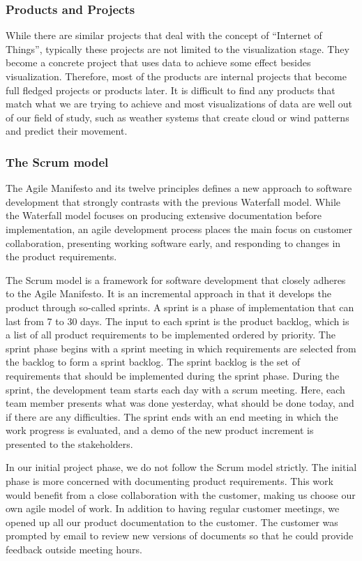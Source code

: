 \documentclass[../document]{subfiles}
\begin{document}
\subsubsection{Products and Projects}
While there are similar projects that deal with the concept of “Internet of Things”, typically these projects are not limited to the visualization stage. They become a concrete project that uses data to achieve some effect besides visualization. Therefore, most of the products are internal projects that become full fledged projects or products later. It is difficult to find any products that match what we are trying to achieve and most visualizations of data are well out of our field of study, such as weather systems that create cloud or wind patterns and predict their movement.

\subsubsection{The Scrum model}
The Agile Manifesto and its twelve principles defines a new approach to software development that strongly contrasts with the previous Waterfall model. While the Waterfall model focuses on producing extensive documentation before implementation, an agile development process places the main focus on customer collaboration, presenting working software early, and responding to changes in the product requirements. 

The Scrum model is a framework for software development that closely adheres to the Agile Manifesto. It is an incremental approach in that it develops the product through so-called sprints. A sprint is a phase of implementation that can last from 7 to 30 days. The input to each sprint is the product backlog, which is a list of all product requirements to be implemented ordered by priority. The sprint phase begins with a sprint meeting in which requirements are selected from the backlog to form a sprint backlog. The sprint backlog is the set of requirements that should be implemented during the sprint phase. During the sprint, the development team starts each day with a scrum meeting. Here, each team member presents what was done yesterday, what should be done today, and if there are any difficulties. The sprint ends with an end meeting in which the work progress is evaluated, and a demo of the new product increment is presented to the stakeholders.

In our initial project phase, we do not follow the Scrum model strictly. The initial phase is more concerned with documenting product requirements. This work would benefit from a close collaboration with the customer, making us choose our own agile model of work. In addition to having regular customer meetings, we opened up all our product documentation to the customer. The customer was prompted by email to review new versions of documents so that he could provide feedback outside meeting hours.
\end{document}
